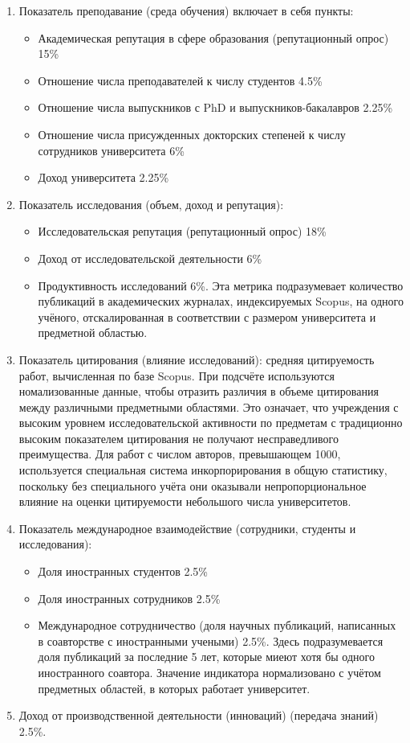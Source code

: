 \begin{enumerate}
  \item Показатель преподавание (среда обучения) включает в себя пункты:
  \begin{itemize}
    \item Академическая репутация в сфере образования (репутационный опрос) 15\%
    \item Отношение числа преподавателей к числу студентов 4.5\%
    \item Отношение числа выпускников с PhD и выпускников-бакалавров 2.25\%
    \item Отношение числа присужденных докторских степеней к числу сотрудников университета 6\%
    \item Доход университета 2.25\%
  \end{itemize}
  \item Показатель исследования (объем, доход и репутация):
  \begin{itemize}
    \item Исследовательская репутация (репутационный опрос) 18\%
    \item Доход от исследовательской деятельности 6\%
    \item Продуктивность исследований 6\%. Эта метрика подразумевает количество публикаций
    в академических журналах, индексируемых Scopus, на одного учёного, отскалированная в
    соответствии с размером университета и предметной областью.
  \end{itemize}
  \item Показатель цитирования (влияние исследований):
    средняя цитируемость работ, вычисленная по базе Scopus. При подсчёте используются
    номализованные данные, чтобы отразить различия в объеме цитирования между различными
    предметными областями. Это означает, что учреждения с высоким уровнем исследовательской
    активности по предметам с традиционно высоким показателем цитирования не получают несправедливого преимущества.
    Для работ с числом авторов, превышающем 1000, используется специальная система
    инкорпорирования в общую статистику, поскольку без специального учёта они оказывали непропорциональное
    влияние на оценки цитируемости небольшого числа университетов.
  \item Показатель международное взаимодействие (сотрудники, студенты и исследования):
  \begin{itemize}
    \item Доля иностранных студентов 2.5\%
    \item Доля иностранных сотрудников 2.5\%
    \item Международное сотрудничество (доля научных публикаций, написанных в
    соавторстве с иностранными учеными) 2.5\%. Здесь подразумевается доля
    публикаций за последние 5 лет, которые миеют хотя бы одного иностранного соавтора. Значение
    индикатора нормализовано с учётом предметных областей, в которых работает университет.
  \end{itemize}
  \item Доход от производственной деятельности (инноваций) (передача знаний) 2.5\%.
\end{enumerate}

